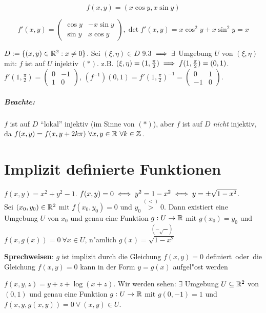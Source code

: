\documentclass[a4paper,twoside,DIV15,BCOR12mm,chapterprefix=true,headings=twolinechapter]{scrbook}
\begin{document}
\begin{beispiel}

$$f(x,y) = (x \cos y, x \sin y)$$

$$f'(x,y) = \begin{pmatrix} \cos y & -x \sin y \\ \sin y & x \cos y \end{pmatrix}, \det f'(x,y) = x \cos^2 y + x \sin^2 y = x$$

$D:=\{(x,y) \in \mathbb{R}^2: x\ne 0\}$. Sei $(\xi, \eta)\in D$ 9.3 $\implies \exists$ Umgebung $U$ von $(\xi, \eta)$ mit: $f$ ist auf $U$ injektiv $(*)$. z.B. $(\xi, \eta) = (1, \frac{\pi}{2}) \implies f(1,\frac{\pi}2) = (0,1)$. $f'(1,\frac{\pi}2) = \begin{pmatrix}0 & -1 \\ 1 & 0 \end{pmatrix}$, $(f^{-1})(0,1) = f'(1,\frac{\pi}{2})^{-1} = \begin{pmatrix}0 & 1 \\ -1 & 0\end{pmatrix}$.

\end{beispiel}

\paragraph{Beachte:} $f$ ist auf $D$ "`lokal"'   injektiv (im Sinne von $(*)$), aber $f$ ist auf $D$ \emph{nicht} injektiv, da $f(x,y) = f(x,y+2 k\pi) \ \forall x,y\in\mathbb{R} \ \forall k\in\mathbb{Z}$.

\chapter{Implizit definierte Funktionen}
\def\grad{\mathop{\rm grad}\nolimits}
\def\MdU{\ensuremath{\mathbb{U}}}

\begin{beispiele}
\item $f(x,y)=x^2+y^2-1$. $f(x,y)=0\iff y^2=1-x^2\iff y=\pm\sqrt{1-x^2}$. \\
Sei $(x_0, y_0)\in\mathbb{R}^2$ mit $f(x_0, y_0)=0$ und $y_0\overset{(<)}{>}0$. Dann existiert eine Umgebung $U$ von $x_0$ und genau eine Funktion $g:U\to\mathbb{R}$ mit $g(x_0)=y_0$ und $f(x,g(x))=0\ \forall x \in U$, n"amlich $g(x)=\overset{(-\sqrt{\cdots})}{\sqrt{1-x^2}}$

\textbf{Sprechweisen}: \glqq $g$ ist implizit durch die Gleichung $f(x,y)=0$ definiert\grqq\ oder\ \glqq die Gleichung $f(x,y)=0$ kann in der Form $y=g(x)$ aufgel"ost werden\grqq

\item $f(x,y,z)=y+z+\log(x+z)$. Wir werden sehen: $\exists$ Umgebung $U\subseteq \mathbb{R}^2$ von $(0,1)$ und genau eine Funktion $g:U\to\mathbb{R}$ mit $g(0,-1)=1$ und $f(x,y,g(x,y))=0\ \forall\ (x,y)\in U$.
\end{beispiele}
\end{document}

